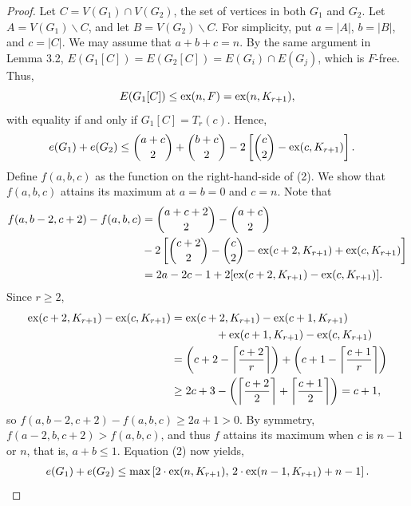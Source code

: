 \documentclass[a4paper]{article}
\begin{document}
\begin{proof}
  Let $C = V(G_1) \cap V(G_2)$, the set of vertices in both $G_1$ and $G_2$. Let $A = V(G_1)
  \backslash C$, and let $B = V(G_2) \backslash C$. For simplicity, put $a = |A|$, $b = |B|$, and $c
  = |C|$. We may assume that $a + b + c = n$. By the same argument in Lemma 3.2, $E(G_1[C]) =
  E(G_2[C]) = E(G_i) \cap E(G_j)$, which is $F$-free. Thus, 
  \[
    E(G_1[C]) \leq \textnormal{ex}(n, F) = \textnormal{ex}(n, K_{r + 1}),
  \]
  with equality if and only if $G_1[C] = T_r(c)$. Hence, 
  \begin{align}
    e(G_1) + e(G_2) 
    &\leq \binom{a + c}{2} + \binom{b + c}{2} - 2\left[\binom{c}{2} - \textnormal{ex}(c, K_{r + 1})\right].
  \end{align}
  Define $f(a, b, c)$ as the function on the right-hand-side of (2). We show that $f(a, b, c)$
  attains its maximum at $a = b = 0$ and $c = n$. Note that
  \begin{align*}
    f(a, b - 2, c + 2) - f(a, b, c)
    &= \binom{a + c + 2}{2} - \binom{a + c}{2} \\
    &- 2\left[\binom{c + 2}{2} - \binom{c}{2} - \textnormal{ex}(c + 2, K_{r + 1}) + \textnormal{ex}(c, K_{r + 1})\right] \\
    &= 2a - 2c - 1 + 2[\textnormal{ex}(c + 2, K_{r + 1}) - \textnormal{ex}(c, K_{r + 1})].
  \end{align*}
  Since $r \geq 2$,
  \begin{align*}
    \textnormal{ex}(c + 2, K_{r + 1}) - \textnormal{ex}(c, K_{r + 1}) &= \textnormal{ex}(c + 2, K_{r + 1}) - \textnormal{ex}(c + 1, K_{r + 1}) \\
    &\qquad\qquad + \textnormal{ex}(c + 1, K_{r + 1}) - \textnormal{ex}(c, K_{r + 1}) \\
    &= \left(c + 2 - \left\lceil \frac{c + 2}{r} \right\rceil\right) + \left(c + 1 - \left\lceil \frac{c + 1}{r} \right\rceil\right) \\
    &\geq 2c + 3 - \left(\left\lceil \frac{c + 2}{2} \right\rceil + \left\lceil \frac{c + 1}{2} \right\rceil\right) = c + 1,
  \end{align*}
  so $f(a, b - 2, c + 2) - f(a, b, c) \geq 2a + 1 > 0$. By symmetry, $f(a - 2, b, c + 2) > f(a, b,
  c)$, and thus $f$ attains its maximum when $c$ is $n - 1$ or $n$, that is, $a + b \leq 1$.
  Equation (2) now yields, 
  \begin{align*}
    e(G_1) + e(G_2) \leq \max\left[2 \cdot \textnormal{ex}(n, K_{r + 1}), \, 2 \cdot \textnormal{ex}(n - 1, K_{r + 1}) + n - 1\right].
  \end{align*}

\end{proof}
\end{document}
